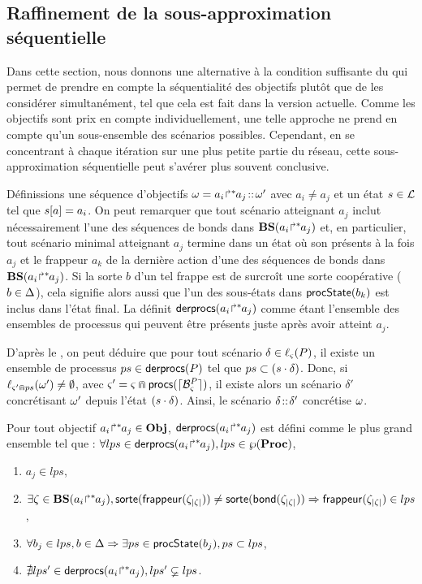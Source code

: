 \subsection{Raffinement de la sous-approximation séquentielle}

Dans cette section, nous donnons une alternative à la condition suffisante du 
qui permet de prendre en compte la séquentialité des objectifs plutôt que de les considérer
simultanément, tel que cela est fait dans la version actuelle.
Comme les objectifs sont prix en compte individuellement, une telle approche ne prend en compte
qu'un sous-ensemble des scénarios possibles.
Cependant, en se concentrant à chaque itération sur une plus petite partie du réseau, 
cette sous-approximation séquentielle peut s'avérer plus souvent conclusive.

Définissions une séquence d'objectifs $\omega = {a_i\!\Rsh^*\!\!a_j} \!::\! \omega'$ avec
$a_i \neq a_j$ et un état $s \in \mathcal{L}$ tel que $s[{a}] = a_i$.
On peut remarquer que tout scénario atteignant $a_j$ inclut nécessairement l'une des séquences
de bonds dans $\mathbf{BS}({a_i\!\Rsh^*\!\!a_j})$ et, en particulier,
tout scénario minimal atteignant $a_j$ termine dans un état où son présents à la fois
$a_j$ et le frappeur $a_k$ de la dernière action d'une des séquences de bonds
dans $\mathbf{BS}({a_i\!\Rsh^*\!\!a_j})$.
Si la sorte $b$ d'un tel frappe est de surcroît une sorte coopérative ($b \in \Delta$),
cela signifie alors aussi que l'un des sous-états dans $\mathsf{procState}(b_k)$
est inclus dans l'état final.
La  définit $\mathsf{derprocs}({a_i\!\Rsh^*\!\!a_j})$ comme étant l'ensemble des ensembles
de processus qui peuvent être présents juste après avoir atteint $a_j$.

D'après le , on peut déduire que pour tout scénario $\delta \in \ell_\varsigma(P)$,
il existe un ensemble de processus $ps \in \mathsf{derprocs}(P)$ tel que $ps \subset (s \cdot \delta)$.
Donc, si $\ell_{\varsigma' \Cap ps}(\omega') \neq \emptyset$,
avec $\varsigma' = \varsigma \Cap \mathsf{procs}(\lceil \mathcal{B}_{\varsigma}^{P}\rceil)$,
il existe alors un scénario $\delta'$ concrétisant $\omega'$ depuis l'état $(s \cdot \delta)$.
Ainsi, le scénario  $\delta \!::\! \delta'$ concrétise $\omega$.

\begin{definition}[$\derprocs : \Obj \to \powerset(\powerset(\Proc))$]
  Pour tout objectif ${a_i\!\Rsh^*\!\!a_j} \in \mathbf{Obj}$, $\mathsf{derprocs}({a_i\!\Rsh^*\!\!a_j})$
  est défini comme le plus grand ensemble tel que :
  $\forall lps \in \mathsf{derprocs}({a_i\!\Rsh^*\!\!a_j}), lps \in \wp(\mathbf{Proc})$,
  \begin{enumerate}
    \item $a_j \in lps$,
    \item $\exists \zeta \in \mathbf{BS}({a_i\!\Rsh^*\!\!a_j}),
        \mathsf{sorte}(\mathsf{frappeur}(\zeta_{|\zeta|})) \neq \mathsf{sorte}(\mathsf{bond}(\zeta_{|\zeta|}))
        \Rightarrow \mathsf{frappeur}(\zeta_{|\zeta|}) \in lps$,
    \item $\forall b_j \in lps, b \in \Delta \Rightarrow \exists ps \in \mathsf{procState}(b_j), ps \subset lps$,
    \item $\nexists lps'\in \mathsf{derprocs}({a_i\!\Rsh^*\!\!a_j}), lps' \varsubsetneq lps$.
  \end{enumerate}
\end{definition}

